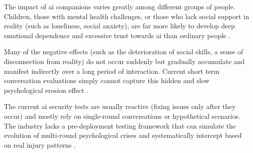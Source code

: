 The impact of \gls{ai} companions varies greatly among different groups of people. Children, those with mental health challenges, or those who lack social support in reality (such as loneliness, social anxiety), are far more likely to develop deep emotional dependence and excessive trust towards \gls{ai} than ordinary people \cite[pp.~5533--5535]{malfacini_impacts_2025}.


Many of the negative effects (such as the deterioration of social skills, a sense of disconnection from reality) do not occur suddenly but gradually accumulate and manifest indirectly over a long period of interaction. Current short term conversation evaluations simply cannot capture this hidden and slow psychological erosion effect \cite[p.~3]{archiwaranguprok_simulating_2025}. 

The current \gls{ai} security tests are usually reactive (fixing issues only after they occur) and mostly rely on single-round conversations or hypothetical scenarios. The industry lacks a pre-deployment testing framework that can simulate the evolution of multi-round psychological crises and systematically intercept based on real injury patterns \cite[pp.~2--3]{archiwaranguprok_simulating_2025}.

